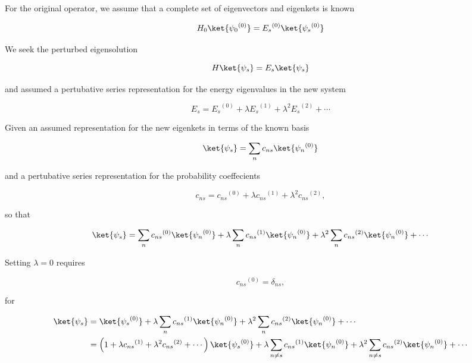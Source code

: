 For the original operator, we assume that a complete set of eigenvectors and eigenkets is known

\begin{equation}\label{eqn:qmTwoL4:30}
H_0 \ket{{\psi_0}^{(0)}} = {E_s}^{(0)} \ket{{\psi_s}^{(0)}}
\end{equation}

We seek the perturbed eigensolution

\begin{equation}\label{eqn:qmTwoL4:50}
H \ket{\psi_s} = E_s \ket{\psi_s}
\end{equation}

and assumed a pertubative series representation for the energy eigenvalues in the new system

\begin{equation}\label{eqn:qmTwoL4:70}
E_s = {E_s}^{(0)} + \lambda {E_s}^{(1)} + \lambda^2 {E_s}^{(2)} + \cdots
\end{equation}

Given an assumed representation for the new eigenkets in terms of the known basis

\begin{equation}\label{eqn:qmTwoL4:90}
\ket{\psi_s} = \sum_n c_{ns} \ket{{\psi_n}^{(0)}} 
\end{equation}

and a pertubative series representation for the probability coeffecients

\begin{equation}\label{eqn:qmTwoL4:110}
c_{ns} = {c_{ns}}^{(0)} + \lambda {c_{ns}}^{(1)} + \lambda^2 {c_{ns}}^{(2)},
\end{equation}

so that 

\begin{equation}\label{eqn:qmTwoL4:130}
\ket{\psi_s} = 
\sum_n {c_{ns}}^{(0)} \ket{{\psi_n}^{(0)}} 
+
\lambda
\sum_n {c_{ns}}^{(1)} \ket{{\psi_n}^{(0)}} 
+ 
\lambda^2
\sum_n {c_{ns}}^{(2)} \ket{{\psi_n}^{(0)}} 
+ \cdots
\end{equation}

Setting $\lambda = 0$ requires 

\begin{equation}\label{eqn:qmTwoL4:150}
{c_{ns}}^{(0)} = \delta_{ns},
\end{equation}

for

\begin{equation}\label{eqn:qmTwoL4:170}
\begin{aligned}
\ket{\psi_s} 
&= 
\ket{{\psi_s}^{(0)}} 
+
\lambda
\sum_n {c_{ns}}^{(1)} \ket{{\psi_n}^{(0)}} 
+ 
\lambda^2
\sum_n {c_{ns}}^{(2)} \ket{{\psi_n}^{(0)}} 
+ \cdots \\
&=
\left(
1 
+ \lambda {c_{ns}}^{(1)} 
+ \lambda^2 {c_{ns}}^{(2)} 
+ \cdots
\right)
\ket{{\psi_s}^{(0)}} 
+ 
\lambda
\sum_{n \ne s} {c_{ns}}^{(1)} \ket{{\psi_n}^{(0)}} 
+
\lambda^2
\sum_{n \ne s} {c_{ns}}^{(2)} \ket{{\psi_n}^{(0)}} 
+ \cdots
\end{aligned}
\end{equation}

